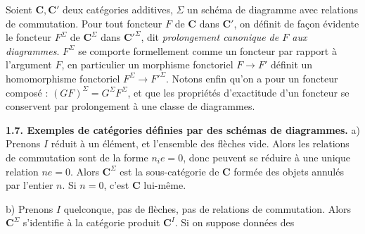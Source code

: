 Soient $\mathbf{C},\mathbf{C}'$ deux catégories additives, $\Sigma$ un schéma de diagramme avec
relations de commutation. Pour tout foncteur $F$ de $\mathbf{C}$ dans $\mathbf{C}'$, on définit
de façon évidente le foncteur $F^\Sigma$ de $\mathbf{C}^\Sigma$ dans $\mathbf{C}'^\Sigma$, dit
\textit{prolongement canonique de $F$ aux diagrammes}. $F^\Sigma$ se comporte
formellement comme un foncteur par rapport à l'argument $F$, en particulier un
morphisme fonctoriel $F\to F'$ définit un homomorphisme fonctoriel
$F^\Sigma\to F'^\Sigma$. Notons enfin qu'on a pour un foncteur
composé : $(GF)^\Sigma=G^\Sigma F^\Sigma$, et que les propriétés d'exactitude d'un foncteur se conservent par
prolongement à une classe de diagrammes.

\textbf{1.7. Exemples de catégories définies par des schémas de
diagrammes.}
a) Prenons $I$ réduit à un élément, et l'ensemble des flèches vide.
Alors les relations de commutation sont de la forme $n_i e=0$, donc peuvent se
réduire à une unique relation $ne=0$. Alors $\mathbf{C}^\Sigma$ est la sous-catégorie de
$\mathbf{C}$ formée des objets annulés par l'entier $n$. Si $n=0$, c'est $\mathbf{C}$ lui-même.

b) Prenons $I$ quelconque, pas de flèches, pas de relations de
commutation. Alors $\mathbf{C}^\Sigma$ s'identifie à la catégorie produit $\mathbf{C}^I$. Si on
suppose données des

